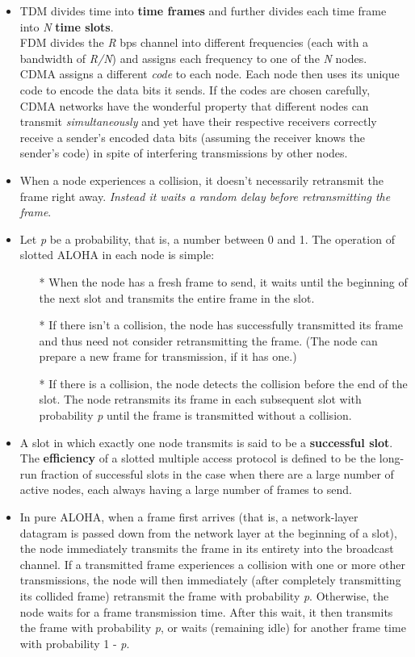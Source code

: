 \begin{itemize}
\item
TDM divides time into \textbf{time frames} and further divides each time frame into \textit{N} \textbf{time slots}.\\
FDM divides the \textit{R} bps channel into different frequencies (each with a bandwidth of \textit{R/N}) and assigns each frequency to one of the \textit{N} nodes.\\
CDMA assigns a different \textit{code} to each node. Each node then uses its unique code to encode the data bits it sends. If the codes are chosen carefully, CDMA networks have the wonderful property that different nodes can transmit \textit{simultaneously} and yet have their respective receivers correctly receive a sender's encoded data bits (assuming the receiver knows the sender's code) in spite of interfering transmissions by other nodes.

\item
When a node experiences a collision, it doesn't necessarily retransmit the frame right away. \textit{Instead it waits a random delay before retransmitting the frame}.

\item
Let \textit{p} be a probability, that is, a number between 0 and 1. The operation of slotted ALOHA in each node is simple:
\begin{itemize}
\item[*]When the node has a fresh frame to send, it waits until the beginning of the next slot and transmits the entire frame in the slot.
\item[*]If there isn't a collision, the node has successfully transmitted its frame and thus need not consider retransmitting the frame. (The node can prepare a new frame for transmission, if it has one.)
\item[*]If there is a collision, the node detects the collision before the end of the slot. The node retransmits its frame in each subsequent slot with probability \textit{p} until the frame is transmitted without a collision.
\end{itemize}

\item
A slot in which exactly one node transmits is said to be a \textbf{successful slot}. The \textbf{efficiency} of a slotted multiple access protocol is defined to be the long-run fraction of successful slots in the case when there are a large number of active nodes, each always having a large number of frames to send.

\item
In pure ALOHA, when a frame first arrives (that is, a network-layer datagram is passed down from the network layer at the beginning of a slot), the node immediately transmits the frame in its entirety into the broadcast channel. If a transmitted frame experiences a collision with one or more other transmissions, the node will then immediately (after completely transmitting its collided frame) retransmit the frame with probability \textit{p}. Otherwise, the node waits for a frame transmission time. After this wait, it then transmits the frame with probability \textit{p}, or waits (remaining idle) for another frame time with probability 1 - \textit{p}.


\end{itemize}
